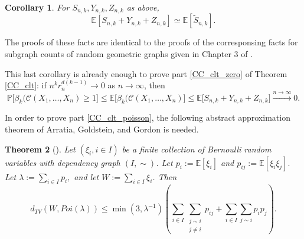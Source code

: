 \documentclass{amsart}
\newtheorem{thm}{Theorem}[section]
\newtheorem{cor}[thm]{Corollary}
\theoremstyle{definition}
\newcommand{\E}{\mathbb{E}}
\renewcommand{\P}{\mathbb{P}}
\newcommand{\s}{\widetilde{S}}
\renewcommand{\1}{\mathbb{1}}
\begin{document}
\begin{cor}
For $S_{n,k},Y_{n,k},Z_{n,k}$ as above, 
$$\E[S_{n,k}+Y_{n,k}+Z_{n,k}]\simeq\E[\s_{n,k}].$$
\end{cor}


The proofs of these facts are identical to the proofs of the corresponsing 
facts for subgraph counts of random geometric graphs given in Chapter 3 of 
\cite{penrose}.  


\begin{comment}
\begin{proof}
Let $B_{n,A}$ be the event that $\{X_1,\ldots,X_k\}$ form an isolated
empty $k$-simplex with respect to $r_n$, with left-most point in $A$.  
Given that $\{X_1,\ldots,X_k\}$ form an empty $k$-simplex with respect to 
$r_n$ with left-most point in $A$,
the conditional probability of $B_{n,A}$ is simply the probability that no 
edges connect $\{X_i\}_{1\le i\le k}$ to $\{X_i\}_{k< i\le n}$.  Since 
 $\{X_1,\ldots,X_k\}$ form an empty $k$-simplex, they must all lie inside
a ball of radius $2r_n$, and so the conditional probability in question
is bounded below by $(1-\|f\|_\infty\theta_d(4r_n)^d)^{n-k}$.  It follows
that 
\begin{align*}
(1-\|f\|_\infty\theta_d(4r_n)^d)^{n-k}\E[\xi_{(1,\ldots,k)}\1_{\{LMP(X_1, \ldots,X_k)\in A\}}] & \le \P[B_n] \\
& \le \E[\xi_{(1,\ldots,k)}\1_{\{LMP(X_1,\ldots,X_k)\in A\}}],
\end{align*}
and thus
$$(1-\|f\|_\infty\theta_d(4r_n)^d)^{n-k}\E[S_{n,k,A}]\le\E[\s_{n,k,A}]
\le\E[S_{n,k,A}].$$
Since $r_n=o\left(n^{-1/d}\right)$, $(1-\|f\|_\infty\theta_d(4r_n)^d)^{n-k}$
tends to one as $n$ tends to infinity. 
\end{proof}
\end{comment}

\medskip

This last corollary is already enough to prove part \ref{CC_clt_zero} of Theorem
\ref{CC_clt}: if $n^kr_n^{d(k-1)}\to0$ as $n\to\infty$, then 
$$\P\big[\beta_k(\mathcal{C}(X_1,\ldots,X_n)\ge 1\big]\le\E\big[
\beta_k(\mathcal{C}(X_1,\ldots,X_n)\big]\le\E\big[S_{n,k}+Y_{n,k}+
Z_{n,k}\big]\xrightarrow{n\to\infty}0.$$ 

\medskip

In order to prove part \ref{CC_clt_poisson}, the following 
abstract approximation theorem of Arratia, Goldstein, and Gordon is needed.

\begin{thm}[\cite{agg}]\label{Poi-approx}
Let $(\xi_i,i\in I)$ be a finite collection of Bernoulli random variables
with dependency graph $(I,\sim)$.  Let $p_i:=\E[\xi_i]$ and $p_{ij}:=\E[\xi_i
\xi_j].$  Let $\lambda:=\sum_{i\in I}p_i,$ and let $W:=\sum_{i\in I}\xi_i$.  
Then $$d_{TV}(W,Poi(\lambda))\le\min(3,\lambda^{-1})\left(\sum_{i\in I}\sum_{
\substack{j\sim i\\j\neq i}}p_{ij}+\sum_{i\in I}\sum_{j\sim i}p_ip_j\right). $$ 
\end{thm}
\end{document}
